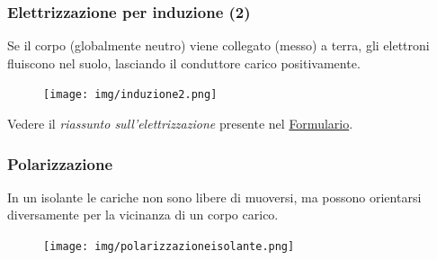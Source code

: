 \documentclass[]{beamer}
\theoremstyle{plain}
\begin{document}
\begin{frame}
\frametitle{Elettrizzazione per induzione (2)}
Se il corpo (globalmente neutro) viene collegato (messo) a terra, gli elettroni fluiscono nel suolo, lasciando il conduttore carico positivamente.
\begin{figure}
\texttt{[image: img/induzione2.png]}
\end{figure}
Vedere il \emph{riassunto sull'elettrizzazione} presente nel \underline{Formulario}.
\end{frame}



\begin{frame}
\frametitle{Polarizzazione}
In un isolante le cariche non sono libere di muoversi, ma possono orientarsi diversamente per la vicinanza di un corpo carico.
\begin{figure}
\texttt{[image: img/polarizzazioneisolante.png]}
\end{figure}
\end{frame}
\end{document}
